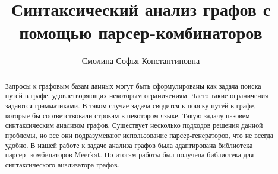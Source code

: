 \title{Синтаксический анализ графов с помощью парсер-комбинаторов}
\author{Смолина Софья Константиновна}
\maketitle

\begin{abstract}
Запросы к графовым базам данных могут быть сформулированы как
задача поиска путей в графе, удовлетворяющих некоторым ограничениям.
Часто такие ограничения задаются грамматиками. В таком случае задача
сводится к поиску путей в графе, которые бы соответствовали строкам в
некотором языке. Такую задачу назовем синтаксическим анализом графов.
Существует несколько подходов решения данной проблемы, но все они
подразумевают использование парсер-генераторов, что не всегда удобно. В
нашей работе к задаче анализа графов была адаптирована библиотека парсер-
комбинаторов Meerkat. По итогам работы был получена библиотека для синтаксического
анализатора графов.
\end{abstract}







